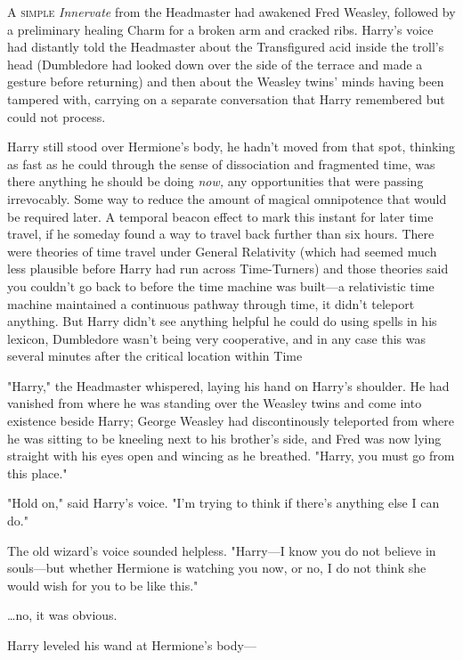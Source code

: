 
\lettrine{A}{ simple}
\emph{Innervate} from the Headmaster had awakened Fred Weasley, followed by a 
preliminary healing Charm for a broken arm and cracked ribs. Harry's voice had 
distantly told the Headmaster about the Transfigured acid inside the troll's 
head (Dumbledore had looked down over the side of the terrace and made a 
gesture before returning) and then about the Weasley twins' minds having been 
tampered with, carrying on a separate conversation that Harry remembered but 
could not process.

Harry still stood over Hermione's body, he hadn't moved from that spot, 
thinking as fast as he could through the sense of dissociation and fragmented 
time, was there anything he should be doing \emph{now,} any opportunities that 
were passing irrevocably. Some way to reduce the amount of magical omnipotence 
that would be required later. A temporal beacon effect to mark this instant for 
later time travel, if he someday found a way to travel back further than six 
hours. There were theories of time travel under General Relativity (which had 
seemed much less plausible before Harry had run across Time-Turners) and those 
theories said you couldn't go back to before the time machine was built---a 
relativistic time machine maintained a continuous pathway through time, it 
didn't teleport anything. But Harry didn't see anything helpful he could do 
using spells in his lexicon, Dumbledore wasn't being very cooperative, and in 
any case this was several minutes after the critical location within Time

"Harry," the Headmaster whispered, laying his hand on Harry's shoulder. He had 
vanished from where he was standing over the Weasley twins and come into 
existence beside Harry; George Weasley had discontinously teleported from where 
he was sitting to be kneeling next to his brother's side, and Fred was now 
lying straight with his eyes open and wincing as he breathed. "Harry, you must 
go from this place."

"Hold on," said Harry's voice. "I'm trying to think if there's anything else I 
can do."

The old wizard's voice sounded helpless. "Harry---I know you do not believe in 
souls---but whether Hermione is watching you now, or no, I do not think she 
would wish for you to be like this."

{\ldots}no, it was obvious.

Harry leveled his wand at Hermione's body---

